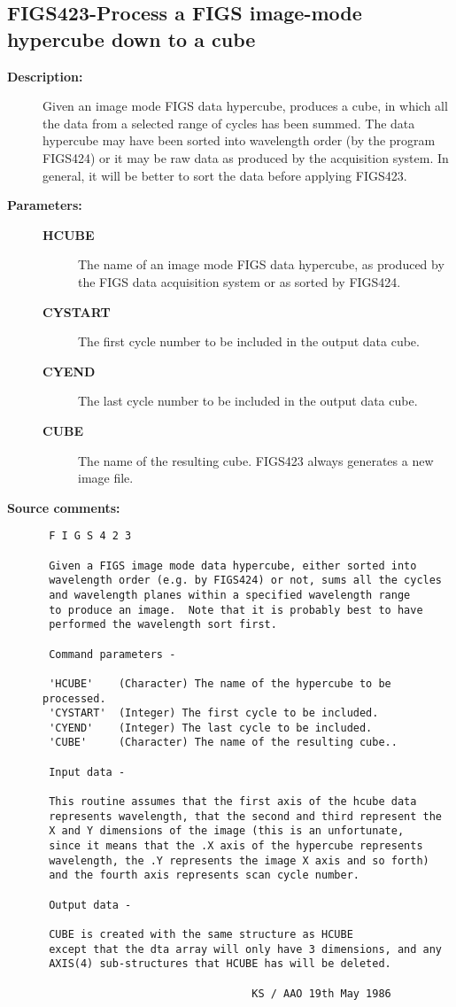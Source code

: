 \subsection{FIGS423-\label{FIGS423}Process a FIGS image-mode hypercube down to a cube}
\begin{description}

\item [{\bf Description:}]
 Given an image mode FIGS data hypercube, produces a cube,
 in which all the data from a selected range of cycles has
 been summed.  The data hypercube may have been sorted into
 wavelength order (by the program FIGS424) or it may be raw
 data as produced by the acquisition system.  In general, it
 will be better to sort the data before applying FIGS423.

\item [{\bf Parameters:}]
\begin{description}
\item [{\bf HCUBE}]
 The name of an image mode FIGS data hypercube,
 as produced by the FIGS data acquisition system
 or as sorted by FIGS424.
\item [{\bf CYSTART}]
 The first cycle number to be included in the
 output data cube.
\item [{\bf CYEND}]
 The last cycle number to be included in the
 output data cube.
\item [{\bf CUBE}]
 The name of the resulting cube.
 FIGS423 always generates a new image file.
\end{description}

\item [{\bf Source comments:}]
\begin{verbatim}
 F I G S 4 2 3

 Given a FIGS image mode data hypercube, either sorted into
 wavelength order (e.g. by FIGS424) or not, sums all the cycles
 and wavelength planes within a specified wavelength range
 to produce an image.  Note that it is probably best to have
 performed the wavelength sort first.

 Command parameters -

 'HCUBE'    (Character) The name of the hypercube to be processed.
 'CYSTART'  (Integer) The first cycle to be included.
 'CYEND'    (Integer) The last cycle to be included.
 'CUBE'     (Character) The name of the resulting cube..

 Input data -

 This routine assumes that the first axis of the hcube data
 represents wavelength, that the second and third represent the
 X and Y dimensions of the image (this is an unfortunate,
 since it means that the .X axis of the hypercube represents
 wavelength, the .Y represents the image X axis and so forth)
 and the fourth axis represents scan cycle number.

 Output data -

 CUBE is created with the same structure as HCUBE
 except that the dta array will only have 3 dimensions, and any
 AXIS(4) sub-structures that HCUBE has will be deleted.

                                 KS / AAO 19th May 1986
\end{verbatim}
\end{description}
